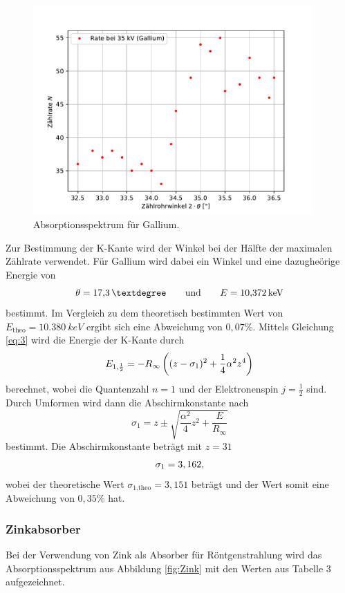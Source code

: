 \begin{figure}[H]
    \centering
    \includegraphics[height=8cm]{Auswertung/Gallium.pdf}
    \caption{Absorptionsspektrum für Gallium.}
    \label{fig:gallium}
\end{figure}

Zur Bestimmung der K-Kante wird der Winkel bei der Hälfte der maximalen Zählrate verwendet.
Für Gallium wird dabei ein Winkel und eine dazugheörige Energie von
\begin{equation}
    \theta = \SI{17.3}{°} \qquad \text{und} \qquad E = \SI{10,372}{keV}  \notag
\end{equation}
bestimmt.
Im Vergleich zu dem theoretisch bestimmten Wert von $E_\text{theo} = \SI{10,380}{keV}$ ergibt sich eine Abweichung von $0,07\%$.
Mittels Gleichung \ref{eq:3} wird die Energie der K-Kante durch
\begin{equation}
    E_\text{$1$,$\frac{1}{2}$} = - R_\infty \left ((z - \sigma_1)^{2} + \frac{1}{4}\alpha^{2}z^{4}\right) \notag
\end{equation}
berechnet, wobei die Quantenzahl $n = 1$ und der Elektronenspin $j = \frac{1}{2}$ sind.
Durch Umformen wird dann die Abschirmkonstante nach
\begin{equation}
    \label{eqn:ab}
    \sigma_1 = z \pm \sqrt{\frac{\alpha^{2}}{4}z^{2} + \frac{E}{R_\infty}} 
\end{equation}
bestimmt.
Die Abschirmkonstante beträgt mit $z = 31$
\begin{equation}
    \sigma_1 = 3,162,   \notag
\end{equation}
wobei der theoretische Wert $\sigma_\text{1,theo} = 3,151$ beträgt und der Wert somit eine Abweichung von $0,35 \%$ hat.


\subsubsection{Zinkabsorber}
Bei der Verwendung von Zink als Absorber für Röntgenstrahlung wird das Absorptionsspektrum aus Abbildung \ref{fig:Zink} mit den Werten aus Tabelle 3 aufgezeichnet.

